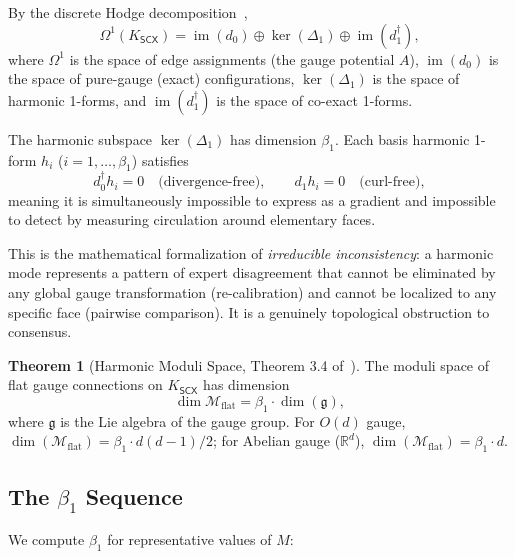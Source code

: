 \documentclass[12pt,a4paper]{article}
\theoremstyle{definition}
\newtheorem{theorem}{Theorem}[section]
\theoremstyle{remark}
\theoremstyle{definition}
\newcommand{\R}{\mathbb{R}}
\newcommand{\SCX}{\textsf{SCX}}
\DeclareMathOperator{\im}{im}
\DeclareMathOperator{\kerOp}{ker}
\begin{document}
By the discrete Hodge decomposition~\cite{scx_fiber_bundle},
\begin{equation}\label{eq:hodge}
  \Omega^1(K_{\SCX}) = \im(d_0) \oplus \kerOp(\Delta_1) \oplus \im(d_1^\dagger),
\end{equation}
where $\Omega^1$ is the space of edge assignments (the gauge potential $A$), $\im(d_0)$ is the space of pure-gauge (exact) configurations, $\kerOp(\Delta_1)$ is the space of harmonic 1-forms, and $\im(d_1^\dagger)$ is the space of co-exact 1-forms.

The harmonic subspace $\kerOp(\Delta_1)$ has dimension $\beta_1$. Each basis harmonic 1-form $h_i$ ($i = 1,\ldots,\beta_1$) satisfies
\begin{equation}
  d_0^\dagger h_i = 0 \quad\text{(divergence-free)},\qquad
  d_1 h_i = 0 \quad\text{(curl-free)},
\end{equation}
meaning it is simultaneously impossible to express as a gradient and impossible to detect by measuring circulation around elementary faces.

This is the mathematical formalization of \emph{irreducible inconsistency}: a harmonic mode represents a pattern of expert disagreement that cannot be eliminated by any global gauge transformation (re-calibration) and cannot be localized to any specific face (pairwise comparison). It is a genuinely topological obstruction to consensus.

\begin{theorem}[Harmonic Moduli Space, Theorem 3.4 of~\cite{scx_gauge_formalized}]\label{thm:moduli}
  The moduli space of flat gauge connections on $K_{\SCX}$ has dimension
  \begin{equation}
    \dim \mathcal{M}_{\text{flat}} = \beta_1 \cdot \dim(\mathfrak{g}),
  \end{equation}
  where $\mathfrak{g}$ is the Lie algebra of the gauge group. For $O(d)$ gauge,
  $\dim(\mathcal{M}_{\text{flat}}) = \beta_1 \cdot d(d-1)/2$;
  for Abelian gauge ($\R^d$), $\dim(\mathcal{M}_{\text{flat}}) = \beta_1 \cdot d$.
\end{theorem}

\subsection{The $\beta_1$ Sequence}

We compute $\beta_1$ for representative values of $M$:
\end{document}

